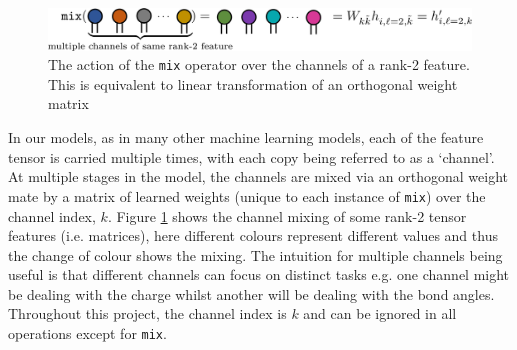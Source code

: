 \begin{figure}[H]
    \centering
    \includegraphics[scale=0.2]{figures/mixing-op.png}
    \caption{The action of the \texttt{mix} operator over the channels of a rank-2 feature. This is equivalent to linear transformation of an orthogonal weight matrix}
    \label{fig:mixing-op}
\end{figure}

In our models, as in many other machine learning models, each of the feature tensor is carried multiple times, with each copy being referred to as a `channel'. At multiple stages in the model, the channels are mixed via an orthogonal weight mate by a matrix of learned weights (unique to each instance of \texttt{mix}) over the channel index, $k$. Figure \ref{fig:mixing-op} shows the channel mixing of some rank-2 tensor features (i.e. matrices), here different colours represent different values and thus the change of colour shows the mixing. The intuition for multiple channels being useful is that different channels can focus on distinct tasks e.g. one channel might be dealing with the charge whilst another will be dealing with the bond angles. Throughout this project, the channel index is $k$ and can be ignored in all operations except for \texttt{mix}.

